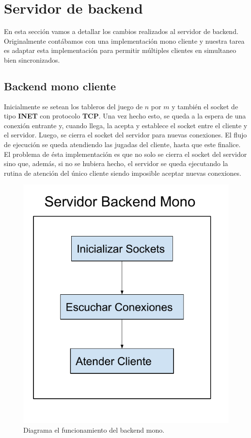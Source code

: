 \section{Servidor de backend}

En esta sección vamos a detallar los cambios realizados al servidor de backend. Originalmente contábamos con una implementación mono cliente y nuestra tarea es adaptar esta implementación para permitir múltiples clientes en simultaneo bien sincronizados.

\subsection{Backend mono cliente}

Inicialmente se setean los tableros del juego de $n$ por $m$ y también el socket de tipo \textbf{INET} con protocolo \textbf{TCP}. Una vez hecho esto, se queda a la espera de una conexión entrante y, cuando llega, la acepta y establece el socket entre el cliente y el servidor. Luego, se cierra el socket del servidor para nuevas conexiones. El flujo de ejecución se queda atendiendo las jugadas del cliente, hasta que este finalice. El problema de ésta implementación es que no solo se cierra el socket del servidor sino que, además, si no se hubiera hecho, el servidor se queda ejecutando la rutina de atención del único cliente siendo imposible aceptar nuevas conexiones.

\begin{figure}[H]
  \begin{center}
	\includegraphics[scale = 0.5]{./imagenes/so_tp2_1.pdf}
	\caption{Diagrama el funcionamiento del backend mono.}
	\label{fig:fig1}
  \end{center}
\end{figure}

